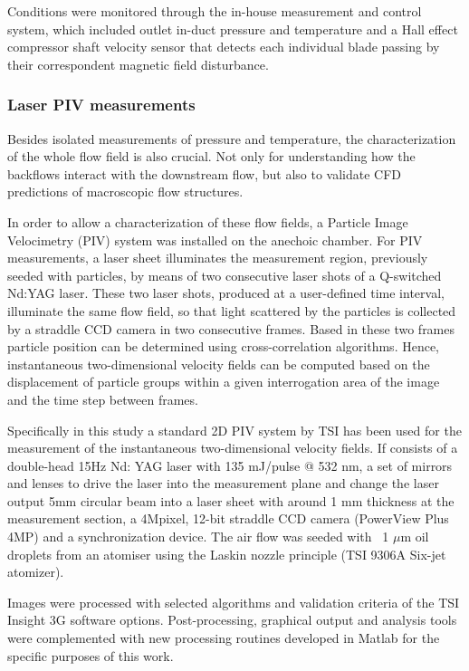 Conditions were monitored through the in-house measurement and control system, which included outlet in-duct pressure and temperature and a Hall effect compressor shaft velocity sensor that detects each individual blade passing by their correspondent magnetic field disturbance.

\subsubsection{Laser PIV measurements}\label{sub:setup_piv}

Besides isolated measurements of pressure and temperature, the characterization of the whole flow field is also crucial. Not only for understanding how the backflows interact with the downstream flow, but also to validate CFD predictions of macroscopic flow structures.

In order to allow a characterization of these flow fields, a Particle Image Velocimetry (PIV) system was installed on the anechoic chamber. For PIV measurements, a laser sheet illuminates the measurement region, previously seeded with particles, by means of two consecutive laser shots of a Q-switched Nd:YAG laser. These two laser shots, produced at a user-defined time interval, illuminate the same flow field, so that light scattered by the particles is collected by a straddle CCD camera in two consecutive frames. Based in these two frames particle position can be determined using cross-correlation algorithms. Hence, instantaneous two-dimensional velocity fields can be computed based on the displacement of particle groups within a given interrogation area of the image and the time step between frames. 

Specifically in this study a standard 2D PIV system by TSI has been used for the measurement of the instantaneous two-dimensional velocity fields. If consists of a double-head 15Hz Nd: YAG laser with 135 mJ/pulse @ 532 nm, a set of mirrors and lenses to drive the laser into the measurement plane and change the laser output 5mm circular beam into a laser sheet with around 1 mm thickness at the measurement section, a 4Mpixel, 12-bit straddle CCD camera (PowerView Plus 4MP) and a synchronization device. 
The air flow was seeded with ~1 $\mu$m oil droplets from an atomiser using the Laskin nozzle principle (TSI 9306A Six-jet atomizer).

Images were processed with selected algorithms and validation criteria of the TSI Insight 3G software options. Post-processing, graphical output and analysis tools were complemented with new processing routines developed in Matlab for the specific purposes of this work. 

